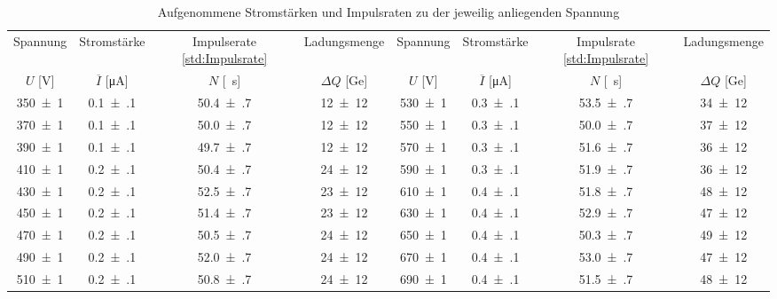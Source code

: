 \begin{table}[!h]
	\centering
	\begin{adjustbox}{width=\textwidth, center}
	\begin{tabular}{|c|c|c|c||c|c|c|c|}
		\hline
		Spannung & Stromstärke & Impulserate \cref{std:Impulsrate}& Ladungsmenge & Spannung & Stromstärke & Impulsrate \cref{std:Impulsrate} & Ladungsmenge\\
		$U$ [\si{\volt}] & $\overline{I}$ [\si{\micro\ampere}] & $N$ [\si{\per\second}] & $\Delta Q$ [\si{\giga e}] & $U$ [\si{\volt}] & $\overline{I}$ [\si{\micro\ampere}] & $N$ [\si{\per\second}] & $\Delta Q$ [\si{\giga e}]\\
\hline\hline
		\num{350(1)} & \num{0.1(1)} & \num{50.4(7)} & \num{12(12)} & \num{530(1)} & \num{0.3(1)} & \num{53.5(7)} & \num{34(12)}\\
		\num{370(1)} & \num{0.1(1)} & \num{50.0(7)} & \num{12(12)} & \num{550(1)} & \num{0.3(1)} & \num{50.0(7)} & \num{37(12)}\\
		\num{390(1)} & \num{0.1(1)} & \num{49.7(7)} & \num{12(12)} & \num{570(1)} & \num{0.3(1)} & \num{51.6(7)} & \num{36(12)}\\
		\num{410(1)} & \num{0.2(1)} & \num{50.4(7)} & \num{24(12)} & \num{590(1)} & \num{0.3(1)} & \num{51.9(7)} & \num{36(12)}\\
		\num{430(1)} & \num{0.2(1)} & \num{52.5(7)} & \num{23(12)} & \num{610(1)} & \num{0.4(1)} & \num{51.8(7)} & \num{48(12)}\\
		\num{450(1)} & \num{0.2(1)} & \num{51.4(7)} & \num{23(12)} & \num{630(1)} & \num{0.4(1)} & \num{52.9(7)} & \num{47(12)}\\
		\num{470(1)} & \num{0.2(1)} & \num{50.5(7)} & \num{24(12)} & \num{650(1)} & \num{0.4(1)} & \num{50.3(7)} & \num{49(12)}\\
		\num{490(1)} & \num{0.2(1)} & \num{52.0(7)} & \num{24(12)} & \num{670(1)} & \num{0.4(1)} & \num{53.0(7)} & \num{47(12)}\\
		\num{510(1)} & \num{0.2(1)} & \num{50.8(7)} & \num{24(12)} & \num{690(1)} & \num{0.4(1)} & \num{51.5(7)} & \num{48(12)}\\
		\hline
	\end{tabular}
	\end{adjustbox}
	\caption{Aufgenommene Stromstärken und Impulsraten zu der jeweilig anliegenden Spannung \label{tab:Auswertung_Ladungsmenge}}
\end{table}

















